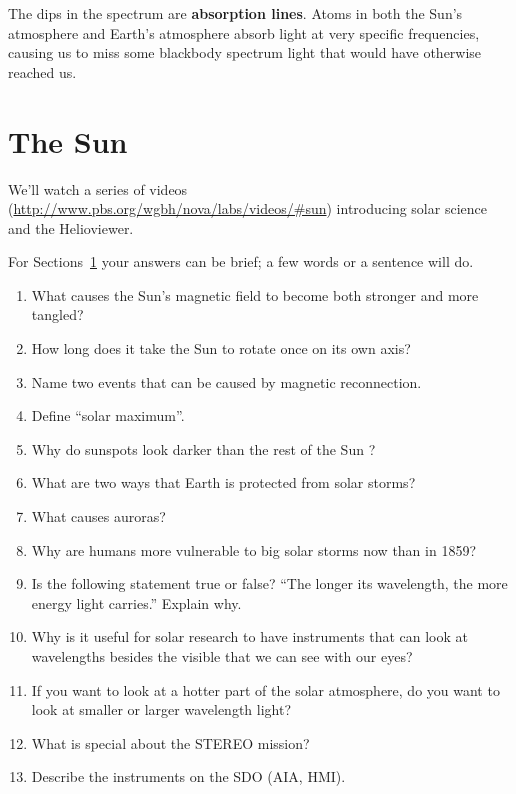 \documentclass[11pt]{article}%
\newcommand{\SPACE}{\vspace{3em}}
\begin{document}
The dips in the spectrum are \textbf{absorption lines}.
Atoms in both the Sun's atmosphere and Earth's atmosphere absorb light at very
specific frequencies, causing us to miss some blackbody spectrum light that
would have otherwise reached us.

\section{The Sun}\label{sec:vid}

We'll watch a series of videos
(\url{http://www.pbs.org/wgbh/nova/labs/videos/\#sun}) introducing solar
science and the Helioviewer.

For Sections~\ref{sec:vid} your answers can be brief; a
few words or a sentence will do.

\begin{enumerate}
\item What causes the Sun's magnetic field to become both stronger and more
    tangled?\SPACE
\item How long does it take the Sun to rotate once on its own axis?\SPACE
\item Name two events that can be caused by magnetic reconnection.\SPACE
\item Define ``solar maximum''.\SPACE
\item Why do sunspots look darker than the rest of the Sun ?\SPACE
\item What are two ways that Earth is protected from solar storms?\SPACE
\item What causes auroras?\SPACE
\item Why are humans more vulnerable to big solar storms now than in 1859?\SPACE
\item Is the following statement true or false? ``The longer its wavelength, the more energy light carries.'' Explain why.\SPACE
\item Why is it useful for solar research to have instruments that can look at wavelengths besides the visible that we can see with our eyes?\SPACE
\item If you want to look at a hotter part of the solar atmosphere, do you want to look at smaller or larger wavelength light?\SPACE
\item What is special about the STEREO mission?\SPACE
\item Describe the instruments on the SDO (AIA, HMI).\SPACE
\end{enumerate}
\end{document}
